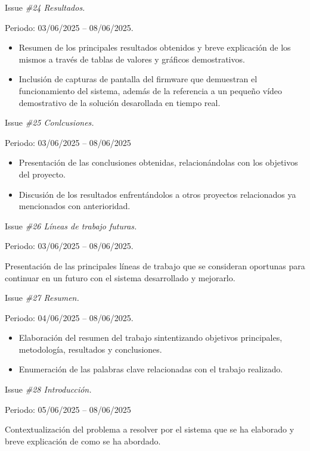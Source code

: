 Issue \textit{\#24 Resultados.}

Periodo: 03/06/2025 – 08/06/2025.

\begin{itemize}
    \item Resumen de los principales resultados obtenidos y breve explicación de los mismos a través de tablas de valores y gráficos demostrativos.
    \item Inclusión de capturas de pantalla del firmware que demuestran el funcionamiento del sistema, además de la referencia a un pequeño vídeo demostrativo de la solución desarollada en tiempo real.
\end{itemize}

Issue \textit{\#25 Conlcusiones.}

Periodo: 03/06/2025 – 08/06/2025

\begin{itemize}
    \item Presentación de las conclusiones obtenidas, relacionándolas con los objetivos del proyecto.
    \item Discusión de los resultados enfrentándolos a otros proyectos relacionados ya mencionados con anterioridad.
\end{itemize}

Issue \textit{\#26 Líneas de trabajo futuras.}

Periodo: 03/06/2025 – 08/06/2025.

Presentación de las principales líneas de trabajo que se consideran oportunas para continuar en un futuro con el sistema desarrollado y mejorarlo.

\vspace{0.3cm}

Issue \textit{\#27 Resumen.}

Periodo: 04/06/2025 – 08/06/2025.

\begin{itemize}
    \item Elaboración del resumen del trabajo sintentizando objetivos principales, metodología, resultados y conclusiones.
    \item Enumeración de las palabras clave relacionadas con el trabajo realizado.
\end{itemize}

Issue \textit{\#28 Introducción.}

Periodo: 05/06/2025 – 08/06/2025

Contextualización del problema a resolver por el sistema que se ha elaborado y breve explicación de como se ha abordado.


